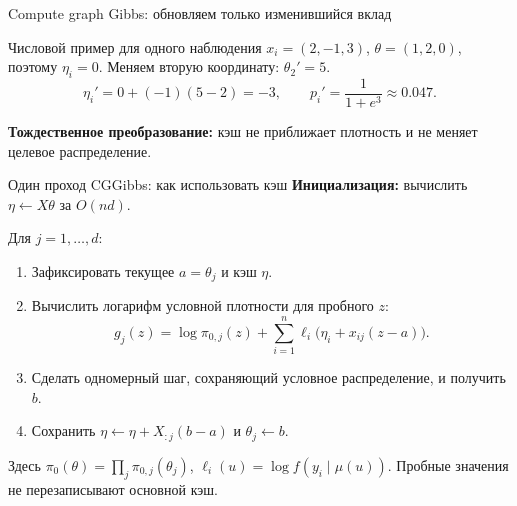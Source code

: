 \begin{frame}{Compute graph Gibbs: обновляем только изменившийся вклад}
  \begin{center}
  \end{center}
  \begin{block}{Числовой пример для одного наблюдения}
    $x_i=(2,-1,3)$, $\theta=(1,2,0)$, поэтому $\eta_i=0$.
    Меняем вторую координату: $\theta_2'=5$.
    \[
      \eta_i'=0+(-1)(5-2)=-3,\qquad p_i'=\frac{1}{1+e^3}\approx0.047.
    \]
  \end{block}
  \textbf{Тождественное преобразование:} кэш не приближает плотность
  и не меняет целевое распределение.
\end{frame}

\begin{frame}{Один проход CGGibbs: как использовать кэш}
  \textbf{Инициализация:} вычислить $\eta\leftarrow X\theta$ за $O(nd)$.
  \medskip

  Для $j=1,\ldots,d$:
  \begin{enumerate}
    \item Зафиксировать текущее $a=\theta_j$ и кэш $\eta$.
    \item Вычислить логарифм условной плотности для пробного $z$:
      \[
        g_j(z)=\log\pi_{0,j}(z)
        +\sum_{i=1}^n\ell_i\bigl(\eta_i+x_{ij}(z-a)\bigr).
      \]
    \item Сделать одномерный шаг, сохраняющий условное распределение,
      и получить $b$.
    \item Сохранить $\eta\leftarrow\eta+X_{:j}(b-a)$ и $\theta_j\leftarrow b$.
  \end{enumerate}
  \medskip
  \small Здесь $\pi_0(\theta)=\prod_j\pi_{0,j}(\theta_j)$,
  $\ell_i(u)=\log f(y_i\mid\mu(u))$.
  Пробные значения не перезаписывают основной кэш.
\end{frame}

